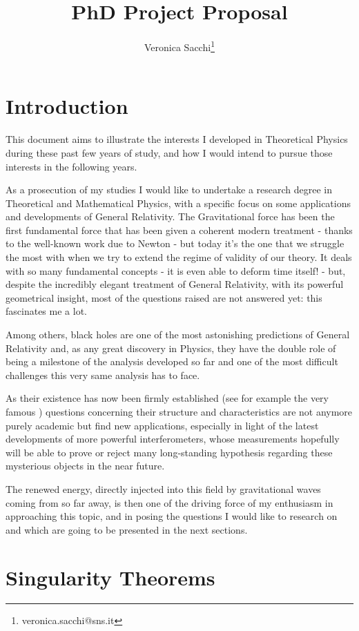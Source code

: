 \documentclass[12pt, a4paper]{article}
\title{PhD Project Proposal}
\author{Veronica Sacchi\thanks{veronica.sacchi@sns.it}}
\begin{document}
\maketitle

\section{Introduction}
This document aims to illustrate the interests I developed in Theoretical Physics during these past few years of study, and how I would intend to pursue those interests in the following years.

As a prosecution of my studies I would like to undertake a research degree in Theoretical and Mathematical Physics, with a specific focus on some applications and developments of General Relativity.
The Gravitational force has been the first fundamental force that has been given a coherent modern treatment - thanks to the well-known work due to Newton - but today it's the one that we struggle the most with when we try to extend the regime of validity of our theory.
It deals with so many fundamental concepts -  it is even able to deform time itself! - but, despite the incredibly elegant treatment of General Relativity, with its powerful geometrical insight, most of the questions raised are not answered yet: this fascinates me a lot.

Among others, black holes are one of the most astonishing predictions of General Relativity and, as any great discovery in Physics, they have the double role of being a milestone of the analysis developed so far and one of the most difficult challenges this very same analysis has to face.

As their existence has now been firmly established (see for example the very famous \cite{falcke1999viewing}) questions concerning their structure and characteristics are not anymore purely academic but find new applications, especially in light of the latest developments of more powerful interferometers, whose measurements hopefully will be able to prove or reject many long-standing hypothesis regarding these mysterious objects in the near future.

The renewed energy, directly injected into this field by gravitational waves coming from so far away, is then one of the driving force of my enthusiasm in approaching this topic, and in posing the questions I would like to research on and which are going to be presented in the next sections.
\clearpage

\section{Singularity Theorems}
\end{document}
